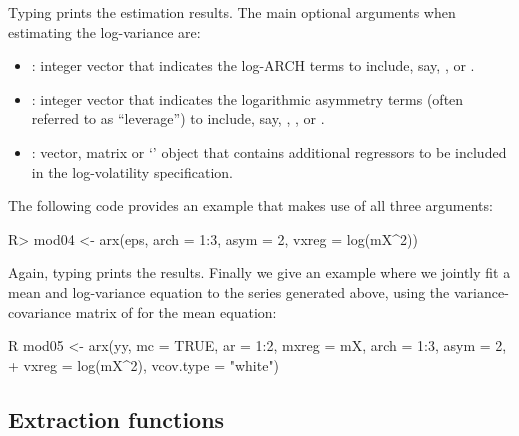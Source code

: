 \documentclass[article,nojss]{jss}
\begin{document}
%
Typing  prints the estimation results. The main optional arguments when estimating the log-variance are:
%
\begin{itemize}
\item {}: integer vector that indicates the log-ARCH terms to include, say, ,  or .
	
\item {}: integer vector that indicates the logarithmic asymmetry terms (often referred to as ``leverage'') to include, say, , , or .

\item {}: vector, matrix or `' object that contains additional regressors to be included in the log-volatility specification.
\end{itemize}
%
The following code provides an example that makes use of all three arguments:
%
\begin{CodeChunk}
\begin{CodeInput}
R> mod04 <- arx(eps, arch = 1:3, asym = 2, vxreg = log(mX^2))
\end{CodeInput}
\end{CodeChunk}
%
Again, typing  prints the results. Finally we give an example where we jointly fit a mean and log-variance equation to the series  generated above, using the variance-covariance matrix of \cite{White80} for the mean equation:
%
\begin{CodeChunk}
\begin{CodeInput}
R mod05 <- arx(yy, mc = TRUE, ar = 1:2, mxreg = mX, arch = 1:3, asym = 2,
+   vxreg = log(mX^2), vcov.type = "white")
\end{CodeInput}
\end{CodeChunk}
%
\subsection{Extraction functions}
\label{subsec:arx:extraction:functions}
\end{document}
